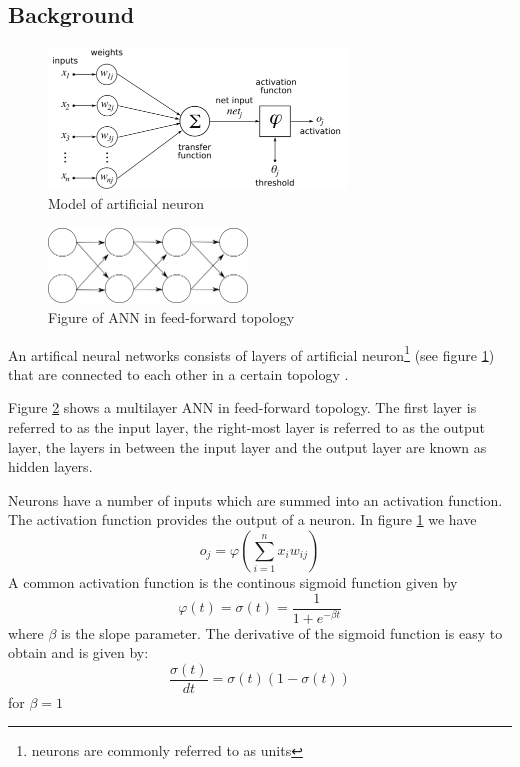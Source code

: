 \subsection{Background}
\begin{figure}
\center
\includegraphics[width=300px]{../images/ANN_neuron.png}
\caption{Model of artificial neuron}
\label{ims:ANN_neuron}
\end{figure}
\begin{figure}
\centerline{\includegraphics[width=200px]{../images/ANN_feedforward.png}}
\caption{Figure of ANN in feed-forward topology}
\label{ims:ANN_FF}
\end{figure}
An artifical neural networks consists of layers of artificial neuron\footnote{neurons are commonly referred to as units} (see figure \ref{ims:ANN_neuron}) that are connected to each other in a certain topology \cite{bishop1995neural}.

Figure \ref{ims:ANN_FF} shows a multilayer ANN in feed-forward topology. The first layer is referred to as the input layer, the right-most layer is referred to as the output layer, the layers in between the input layer and the output layer are known as hidden layers.

Neurons have a number of inputs which are summed into an activation function. The activation function provides the output of a neuron.
In figure \ref{ims:ANN_neuron} we have
\[ o_j = \varphi\left(\sum^{n}_{i=1} x_i w_{ij}\right)  \]
A common activation function is the continous sigmoid function given by
\begin{equation} \varphi(t) = \sigma(t) = \frac{1}{1+e^{-\beta t}}  \label{eq:sigmoid}\end{equation}
where $\beta$ is the slope parameter.
The derivative of the sigmoid function is easy to obtain and is given by:
\begin{equation} \frac{\sigma(t)}{dt} = \sigma(t)(1-\sigma(t))\label{eq:sigmoidd}\end{equation}
for $\beta=1$

